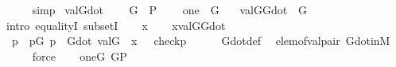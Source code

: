 \begin{isabellebody}
\ \ \ \ \isamarkupfalse%
\ simp\isanewline
{}\isamarkupfalse%
%
\endisatagproof
{\isafoldproof}%
%
\isadelimproof
\isanewline
%
\endisadelimproof
\isanewline
\isanewline
{}\isamarkupfalse%
\ val{\isacharunderscore}{\kern0pt}G{\isacharunderscore}{\kern0pt}dot\ {\isacharcolon}{\kern0pt}\isanewline
\ \ \ {\isachardoublequoteopen}G\ {\isasymsubseteq}\ P{\isachardoublequoteclose}\isanewline
\ \ \ \ {\isachardoublequoteopen}one\ {\isasymin}\ G{\isachardoublequoteclose}\isanewline
\ \ \ {\isachardoublequoteopen}val{\isacharparenleft}{\kern0pt}G{\isacharcomma}{\kern0pt}G{\isacharunderscore}{\kern0pt}dot{\isacharparenright}{\kern0pt}\ {\isacharequal}{\kern0pt}\ G{\isachardoublequoteclose}\isanewline
%
\isadelimproof
%
\endisadelimproof
%
\isatagproof
{}\isamarkupfalse%
\ {\isacharparenleft}{\kern0pt}intro\ equalityI\ subsetI{\isacharparenright}{\kern0pt}\isanewline
\ \ \isamarkupfalse%
\ x\isanewline
\ \ \isamarkupfalse%
\ {\isachardoublequoteopen}x{\isasymin}val{\isacharparenleft}{\kern0pt}G{\isacharcomma}{\kern0pt}G{\isacharunderscore}{\kern0pt}dot{\isacharparenright}{\kern0pt}{\isachardoublequoteclose}\isanewline
\ \ \isamarkupfalse%
\ \isamarkupfalse%
\ {\isasymtheta}\ p\ \ {\isachardoublequoteopen}p{\isasymin}G{\isachardoublequoteclose}\ {\isachardoublequoteopen}{\isasymlangle}{\isasymtheta}{\isacharcomma}{\kern0pt}p{\isasymrangle}\ {\isasymin}\ G{\isacharunderscore}{\kern0pt}dot{\isachardoublequoteclose}\ {\isachardoublequoteopen}val{\isacharparenleft}{\kern0pt}G{\isacharcomma}{\kern0pt}{\isasymtheta}{\isacharparenright}{\kern0pt}\ {\isacharequal}{\kern0pt}\ x{\isachardoublequoteclose}\ {\isachardoublequoteopen}{\isasymtheta}\ {\isacharequal}{\kern0pt}\ check{\isacharparenleft}{\kern0pt}p{\isacharparenright}{\kern0pt}{\isachardoublequoteclose}\isanewline
\ \ \ \ \isamarkupfalse%
\ G{\isacharunderscore}{\kern0pt}dot{\isacharunderscore}{\kern0pt}def\ \isamarkupfalse%
\ elem{\isacharunderscore}{\kern0pt}of{\isacharunderscore}{\kern0pt}val{\isacharunderscore}{\kern0pt}pair\ G{\isacharunderscore}{\kern0pt}dot{\isacharunderscore}{\kern0pt}in{\isacharunderscore}{\kern0pt}M\isanewline
\ \ \ \ \isamarkupfalse%
\ force\isanewline
\ \ \isamarkupfalse%
\ {\isacartoucheopen}one{\isasymin}G{\isacartoucheclose}\ {\isacartoucheopen}G{\isasymsubseteq}P{\isacartoucheclose}\ \isamarkupfalse%
\isanewline

\end{isabellebody}
